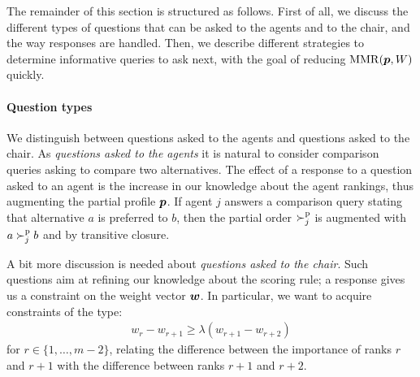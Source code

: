 \documentclass[sigconf, anonymous]{aamas}
\begin{document}
The remainder of this section is structured as follows.
First of all, we discuss the different types of questions that can be asked to the agents and to the chair, and the way responses are handled.
Then, we describe different strategies to determine informative queries to ask next, with the goal of reducing $\operatorname{MMR}({\bm{p}},W)$ quickly.

\paragraph{Question types}
We distinguish between questions asked to the agents and questions asked to the chair.
As {\em questions asked to the agents} it is natural to consider comparison queries asking to compare two alternatives.
The effect of a response to a question asked to an agent is the increase in our knowledge about the agent rankings, thus augmenting the partial profile ${\bm{p}}$. 
If agent $j$ answers a comparison query stating that alternative $a$ is preferred to $b$, then the partial order $\succ^\text{p}_j$ is augmented with $a \succ^\text{p}_j b$ and by transitive closure.

A bit more discussion is needed about {\em questions asked to the chair}.
Such questions aim at refining our knowledge about the scoring rule; a response gives us a constraint on the weight vector $\bm{w}$.
In particular, we want to acquire constraints of the type:
\begin{align}
	w_{r} - w_{r+1} \geq \lambda (w_{r+1} - w_{r+2})
\end{align}
for $r \in \{1,\ldots,m-2\}$, relating the difference between the importance of ranks $r$ and $r+1$ with the difference between ranks $r+1$ and $r+2$.
\end{document}
